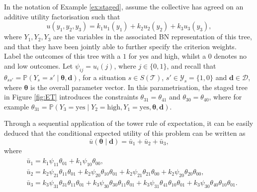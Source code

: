\begin{figure}
\centerline{
\hspace*{-16mm} }
\label{riporto}
\end{figure}

In the notation of Example \ref{ex:staged}, assume the collective has agreed on an additive utility factorisation such that 
\[
u(y_1,y_2,y_3)=k_1u_1(y_1)+k_2u_2(y_2)+k_3u_3(y_3),
\]
where $Y_1,Y_2,Y_3$ are the variables in the associated BN representation of this tree, and that they have been jointly able to further specify the criterion weights.  Label the outcomes of this tree with a $1$ for yes and high, whilst a $0$ denotes no and low outcomes. Let $\psi_{ij}=u_i(j)$, where $j\in\{0,1\}$, and recall that $\theta_{ss'}=\mathbb{P}(Y_s=s'\;|\;\bm{\theta},\bm{d})$, for a situation $s\in S(\mathcal{T})$, $s'\in\mathcal{Y}_s=\{1,0\}$ and $\bm{d}\in\bm{\mathcal{D}}$, where $\bm{\theta}$ is the overall parameter vector. In this parametrisation, the staged tree in Figure \ref{fig:ET} introduces the constraints $\theta_{31}=\theta_{41}$ and $\theta_{30}=\theta_{40}$, where for example $\theta_{31}=\mathbb{P}(Y_3=\text{yes}\;|\; Y_2=\text{high}, Y_1=\text{yes},\bm{\theta},\bm{d})$.

Through a sequential application of the tower rule of expectation, it can be easily deduced that the conditional expected utility of this problem can be written as
\begin{equation}
\label{eq:staged2}
\bar{u}(\bm{\theta}\;|\;\bm{d})=\bar{u}_1+\bar{u}_2+\bar{u}_{3},
\end{equation}
where
\begin{align}
\begin{split}
\label{eq:staged3}
&\bar{u}_1=k_1\psi_{11}\theta_{01}+k_1\psi_{10}\theta_{00},\\
&\bar{u}_2=k_2\psi_{21}\theta_{11}\theta_{01}+k_2\psi_{20}\theta_{10}\theta_{01}+k_2\psi_{21}\theta_{21}\theta_{00}+k_2\psi_{20}\theta_{20}\theta_{00},\\
&\bar{u}_{3}=k_3\psi_{31}\theta_{31}\theta_{11}\theta_{01}+k_3\psi_{30}\theta_{30}\theta_{11}\theta_{01}+k_3\psi_{31}\theta_{41}\theta_{10}\theta_{01}+k_3\psi_{30}\theta_{40}\theta_{10}\theta_{01}.
\end{split}
\end{align}

